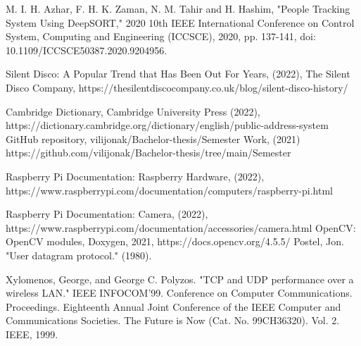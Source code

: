 \documentclass{ctuthesis}
\begin{document}
\begin{thebibliography}{1}

  M. I. H. Azhar, F. H. K. Zaman, N. M. Tahir and H. Hashim, "People Tracking System Using DeepSORT," 2020 10th IEEE International Conference on Control System, Computing and Engineering (ICCSCE), 2020, pp. 137-141, doi: 10.1109/ICCSCE50387.2020.9204956.

  Silent Disco: A Popular Trend that Has Been Out For Years, (2022), The Silent Disco Company, https://thesilentdiscocompany.co.uk/blog/silent-disco-history/
 
  Cambridge Dictionary, Cambridge University Press (2022), https://dictionary.cambridge.org/dictionary/english/public-address-system
  GitHub repository, vilijonak/Bachelor-thesis/Semester Work, (2021) https://github.com/vilijonak/Bachelor-thesis/tree/main/Semester%

  Raspberry Pi Documentation: Raspberry Hardware, (2022), https://www.raspberrypi.com/documentation/computers/raspberry-pi.html

  Raspberry Pi Documentation: Camera, (2022), https://www.raspberrypi.com/documentation/accessories/camera.html
  OpenCV: OpenCV modules, Doxygen, 2021, https://docs.opencv.org/4.5.5/
  Postel, Jon. "User datagram protocol." (1980).
 
  Xylomenos, George, and George C. Polyzos. "TCP and UDP performance over a wireless LAN." IEEE INFOCOM'99. Conference on Computer Communications. Proceedings. Eighteenth Annual Joint Conference of the IEEE Computer and Communications Societies. The Future is Now (Cat. No. 99CH36320). Vol. 2. IEEE, 1999.



\end{thebibliography}
\end{document}
